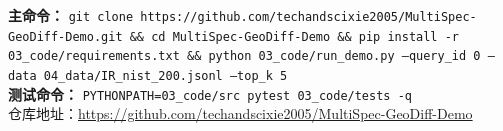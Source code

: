 \documentclass[11pt,a4paper]{ctexart}
\begin{document}
\vspace{6pt}
\begin{center}
{\small\color{greytext}
\textbf{主命令：} \texttt{git clone https://github.com/techandscixie2005/MultiSpec-GeoDiff-Demo.git \&\& cd MultiSpec-GeoDiff-Demo \&\& pip install -r 03\_code/requirements.txt \&\& python 03\_code/run\_demo.py --query\_id 0 --data 04\_data/IR\_nist\_200.jsonl --top\_k 5} \\
\textbf{测试命令：} \texttt{PYTHONPATH=03\_code/src pytest 03\_code/tests -q} \\
仓库地址：\url{https://github.com/techandscixie2005/MultiSpec-GeoDiff-Demo}
}
\end{center}
\end{document}
